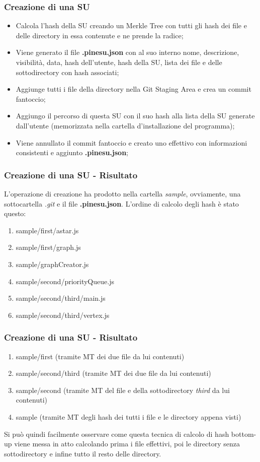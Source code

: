 \documentclass{beamer}
\begin{document}
\begin{frame}
	\frametitle{Creazione di una SU}
	\begin{itemize}
		\item Calcola l'hash della SU creando un Merkle Tree con tutti gli hash dei file e delle directory in essa contenute e ne prende la radice;
		\item Viene generato il file \textbf{.pinesu.json} con al suo interno nome, descrizione, visibilità, data, hash dell'utente, hash della SU, lista dei file e delle sottodirectory con hash associati;
		\item Aggiunge tutti i file della directory nella Git Staging Area e crea un commit fantoccio;
		\item Aggiungo il percorso di questa SU con il suo hash alla lista della SU generate dall'utente (memorizzata nella cartella d'installazione del programma);
		\item Viene annullato il commit fantoccio e creato uno effettivo con informazioni consistenti e aggiunto \textbf{.pinesu.json};
	\end{itemize}
\end{frame}
\begin{frame}
	\frametitle{Creazione di una SU - Risultato}
	L'operazione di creazione ha prodotto nella cartella \emph{sample}, ovviamente, una sottocartella \emph{.git} e il file \textbf{.pinesu.json}. L'ordine di calcolo degli hash è stato questo:
	\begin{enumerate}
		\item sample/first/astar.js
		\item sample/first/graph.js
		\item sample/graphCreator.js
		\item sample/second/priorityQueue.js
		\item sample/second/third/main.js
		\item sample/second/third/vertex.js
		\setcounter{currentenumi}{\theenumi}
	\end{enumerate}
\end{frame}
\begin{frame}
	\frametitle{Creazione di una SU - Risultato}
	\begin{enumerate}
		\setcounter{enumi}{\thecurrentenumi}
		\item sample/first (tramite MT dei due file da lui contenuti)
		\item sample/second/third (tramite MT dei due file da lui contenuti)
		\item sample/second (tramite MT del file e della sottodirectory \emph{third} da lui contenuti)
		\item sample (tramite MT degli hash dei tutti i file e le directory appena visti)
	\end{enumerate}
	Si può quindi facilmente osservare come questa tecnica di calcolo di hash bottom-up viene messa in atto calcolando prima i file effettivi, poi le directory senza sottodirectory e infine tutto il resto delle directory.
\end{frame}
\end{document}

